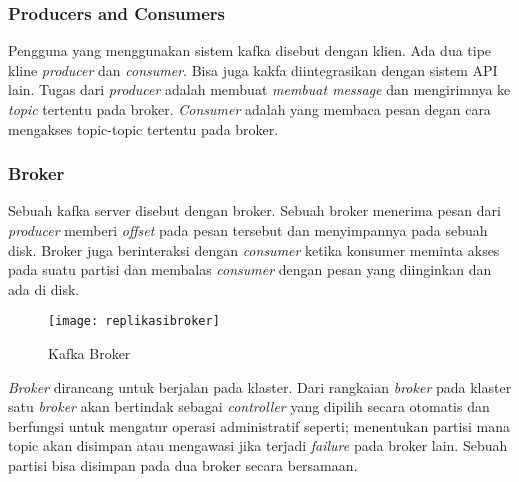 \subsubsection{Producers and Consumers}
Pengguna yang menggunakan sistem kafka disebut dengan klien. Ada dua tipe kline \textit{producer} dan \textit{consumer}. Bisa juga kakfa diintegrasikan dengan sistem API lain. Tugas dari \textit{producer} adalah membuat \textit{membuat message} dan mengirimnya ke \textit{topic} tertentu pada broker. \textit{Consumer} adalah yang membaca pesan degan cara mengakses topic-topic tertentu pada broker.

\subsubsection{Broker}  
 Sebuah kafka server disebut dengan broker. Sebuah broker menerima pesan dari \textit{producer} memberi \textit{offset} pada pesan tersebut dan menyimpannya pada sebuah disk. Broker juga berinteraksi dengan \textit{consumer} ketika konsumer meminta akses pada suatu partisi dan membalas \textit{consumer} dengan pesan yang diinginkan dan ada di disk.
 
 \begin{figure}[H] 
	\centering  
	\texttt{[image: replikasibroker]}  
	\caption[Gambar Kafka Broker]{Kafka Broker} 
	\label{fig:kafka-broker} 
\end{figure}

 \textit{Broker} dirancang untuk berjalan pada klaster. Dari rangkaian \textit{broker} pada klaster
 satu \textit{broker} akan bertindak sebagai \textit{controller} yang dipilih secara otomatis dan berfungsi untuk mengatur operasi administratif seperti; menentukan partisi mana topic akan disimpan atau mengawasi jika terjadi \textit{failure} pada broker lain. Sebuah partisi bisa disimpan pada dua broker secara bersamaan.
 
    
\label{sec:ApacheSpark}


